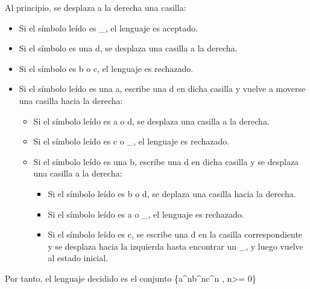 \documentclass[11pt, a4paper, titlepage]{article}
\begin{document}
Al principio, se desplaza a la derecha una casilla:
\begin{itemize}
\item Si el símbolo leído es \_, el lenguaje es aceptado.
\item Si el símbolo es una d, se desplaza una casilla a la derecha.
\item Si el símbolo es b o c, el lenguaje es rechazado.
\item Si el símbolo leído es una a, escribe una d en dicha casilla
  y vuelve a moverse una casilla hacia la derecha:
  \begin{itemize}
  \item Si el símbolo leído es a o d, se desplaza una casilla a la derecha.
  \item Si el símbolo leído es c o \_, el lenguaje es rechazado.
  \item Si el símbolo leído es una b, escribe una d en dicha casilla
    y se desplaza una casilla a la derecha:
    \begin{itemize}
    \item Si el símbolo leído es b o d, se deplaza una casilla hacia la derecha.
    \item Si el símbolo leído es a o \_, el lenguaje es rechazado.
    \item Si el símbolo leído es c, se escribe una d en la casilla correspondiente
      y se desplaza hacia la izquierda hasta encontrar un \_, y luego vuelve al
      estado inicial.
    \end{itemize}
  \end{itemize}
\end{itemize}
Por tanto, el lenguaje decidido es el conjunto \{a^nb^nc^n , n>= 0\}
\end{document}
